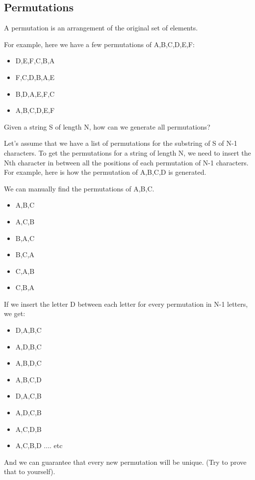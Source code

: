 \documentclass[11pt,oneside]{book}
\begin{document}
\subsection{Permutations}

A permutation is an arrangement of the original set of elements.

For example, here we have a few permutations of A,B,C,D,E,F:

\begin{itemize}
\item D,E,F,C,B,A
\item F,C,D,B,A,E
\item B,D,A,E,F,C
\item A,B,C,D,E,F
\end{itemize}

Given a string S of length N, how can we generate all permutations?

Let's assume that we have a list of permutations for the substring of S of N-1 characters. To get the permutations for a string of length N, we need to insert the Nth character in between all the positions of each permutation of N-1 characters. For example, here is how the permutation of A,B,C,D is generated.

We can manually find the permutations of A,B,C.

\begin{itemize}
\item A,B,C
\item A,C,B
\item B,A,C
\item B,C,A
\item C,A,B
\item C,B,A
\end{itemize}

If we insert the letter D between each letter for every permutation in N-1 letters, we get:

\begin{itemize}
\item D,A,B,C
\item A,D,B,C
\item A,B,D,C
\item A,B,C,D
\item D,A,C,B
\item A,D,C,B
\item A,C,D,B
\item A,C,B,D
.... etc
\end{itemize}

And we can guarantee that every new permutation will be unique. (Try to prove that to yourself).
\end{document}
